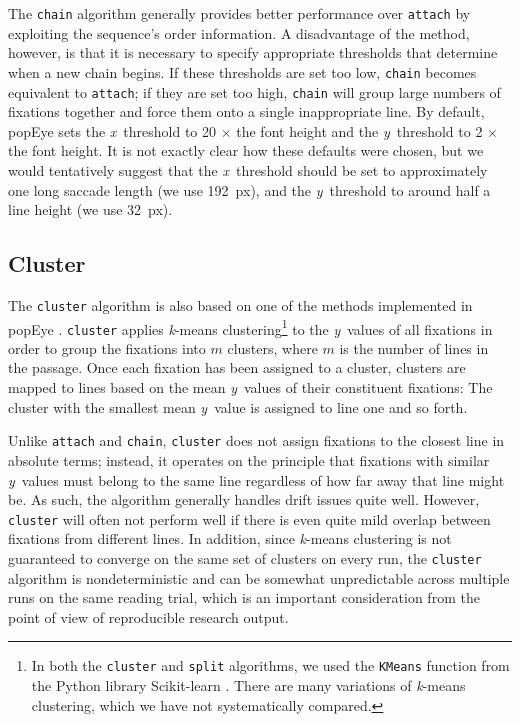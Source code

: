 \documentclass[doc,biblatex]{apa7}
\begin{document}
The \texttt{chain} algorithm generally provides better performance over \texttt{attach} by exploiting the sequence's order information. A disadvantage of the method, however, is that it is necessary to specify appropriate thresholds that determine when a new chain begins. If these thresholds are set too low, \texttt{chain} becomes equivalent to \texttt{attach}; if they are set too high, \texttt{chain} will group large numbers of fixations together and force them onto a single inappropriate line. By default, popEye sets the \textit{x}~threshold to 20 $\times$ the font height and the \textit{y}~threshold to 2 $\times$ the font height. It is not exactly clear how these defaults were chosen, but we would tentatively suggest that the \textit{x}~threshold should be set to approximately one long saccade length (we use 192~px), and the \textit{y}~threshold to around half a line height (we use 32~px).

\subsection{Cluster}

The \texttt{cluster} algorithm is also based on one of the methods implemented in popEye \parencite{Schroeder:0000}. \texttt{cluster} applies \textit{k}-means clustering\footnote{In both the \texttt{cluster} and \texttt{split} algorithms, we used the \texttt{KMeans} function from the Python library Scikit-learn \parencite{scikit-learn}. There are many variations of \textit{k}-means clustering, which we have not systematically compared.} to the \textit{y}~values of all fixations in order to group the fixations into $m$ clusters, where $m$ is the number of lines in the passage. Once each fixation has been assigned to a cluster, clusters are mapped to lines based on the mean \textit{y}~values of their constituent fixations: The cluster with the smallest mean \textit{y}~value is assigned to line one and so forth.

Unlike \texttt{attach} and \texttt{chain}, \texttt{cluster} does not assign fixations to the closest line in absolute terms; instead, it operates on the principle that fixations with similar \textit{y}~values must belong to the same line regardless of how far away that line might be. As such, the algorithm generally handles drift issues quite well. However, \texttt{cluster} will often not perform well if there is even quite mild overlap between fixations from different lines. In addition, since \textit{k}-means clustering is not guaranteed to converge on the same set of clusters on every run, the \texttt{cluster} algorithm is nondeterministic and can be somewhat unpredictable across multiple runs on the same reading trial, which is an important consideration from the point of view of reproducible research output.
\end{document}
